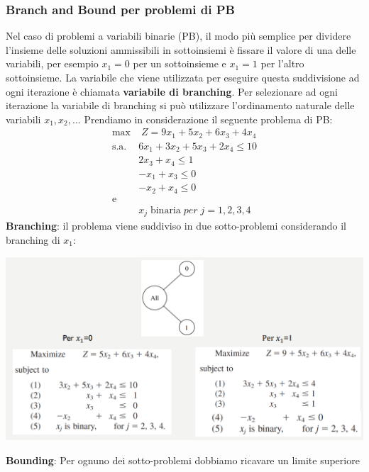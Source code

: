 \documentclass[12pt]{article}
\begin{document}
\subsubsection{Branch and Bound per problemi di PB}
Nel caso di problemi a variabili binarie (PB), il modo più semplice per dividere l'insieme delle soluzioni ammissibili in sottoinsiemi
è fissare il valore di una delle variabili, per esempio $x_1 = 0$ per un sottoinsieme e $x_1 = 1$ per l'altro sottoinsieme.
La variabile che viene utilizzata per eseguire questa suddivisione ad ogni iterazione è chiamata \textbf{variabile di branching}.
Per selezionare ad ogni iterazione la variabile di branching si può utilizzare l'ordinamento naturale delle variabili $x_1, x_2, ...$
Prendiamo in considerazione il seguente problema di PB:
\begin{equation*}
    \begin{array}{ll}
        \displaystyle \textrm{max} & \; Z = 9x_1 + 5x_2 + 6x_3 + 4x_4\\
        \textrm{s.a.} & 6x_1 + 3x_2 + 5x_3 + 2x_4 \leq 10\\
        \phantom{} & 2 x_3 + x_4 \leq 1\\
        \phantom{} & -x_1 + x_3 \leq 0\\
        \phantom{} & -x_2 + x_4 \leq 0 \\
        \textrm{e} \\
        \phantom{} & x_j \; \textrm{binaria} \; per \; j = 1,2,3,4
    \end{array}
\end{equation*}
\textbf{Branching}: il problema viene suddiviso in due sotto-problemi considerando il branching di $x_1$:
\begin{center}
    \includegraphics[width = 1\linewidth]{Images/65.png}
\end{center}
\textbf{Bounding}: Per ognuno dei sotto-problemi dobbiamo ricavare un limite superiore
\end{document}
